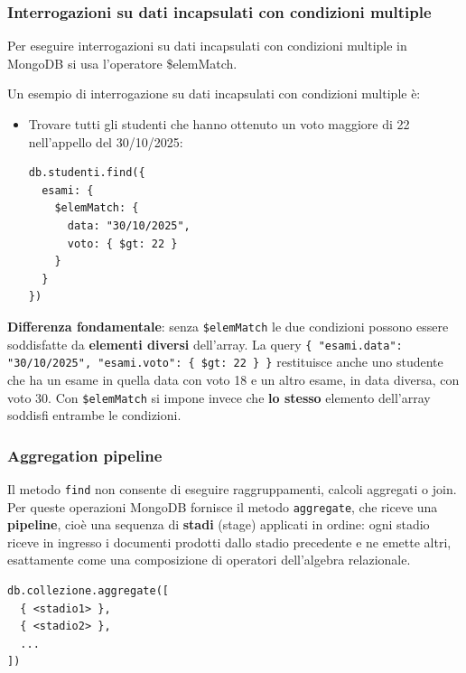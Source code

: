 \documentclass[a4paper,twoside]{article}
\begin{document}
\subsubsection{Interrogazioni su dati incapsulati con condizioni multiple}
Per eseguire interrogazioni su dati incapsulati con condizioni multiple in MongoDB
si usa l'operatore \$elemMatch.

\begin{example}
  Un esempio di interrogazione su dati incapsulati con condizioni multiple è:
  \begin{itemize}
    \item Trovare tutti gli studenti che hanno ottenuto un voto maggiore di 22
      nell'appello del 30/10/2025:
\begin{lstlisting}
db.studenti.find({
  esami: {
    $elemMatch: {
      data: "30/10/2025",
      voto: { $gt: 22 }
    }
  }
})
\end{lstlisting}
  \end{itemize}

  \vspace{1em}
  \noindent
  \textbf{Differenza fondamentale}: senza \texttt{\$elemMatch} le due condizioni possono
  essere soddisfatte da \textbf{elementi diversi} dell'array. La query
  \texttt{\{ "esami.data": "30/10/2025", "esami.voto": \{ \$gt: 22 \} \}} restituisce
  anche uno studente che ha un esame in quella data con voto 18 e un altro esame, in
  data diversa, con voto 30. Con \texttt{\$elemMatch} si impone invece che
  \textbf{lo stesso} elemento dell'array soddisfi entrambe le condizioni.
\end{example}

\subsubsection{Aggregation pipeline}
Il metodo \texttt{find} non consente di eseguire raggruppamenti, calcoli aggregati o
join. Per queste operazioni MongoDB fornisce il metodo \texttt{aggregate}, che riceve una
\textbf{pipeline}, cioè una sequenza di \textbf{stadi} (stage) applicati in ordine: ogni
stadio riceve in ingresso i documenti prodotti dallo stadio precedente e ne emette altri,
esattamente come una composizione di operatori dell'algebra relazionale.
\begin{lstlisting}
db.collezione.aggregate([
  { <stadio1> },
  { <stadio2> },
  ...
])
\end{lstlisting}
\end{document}
